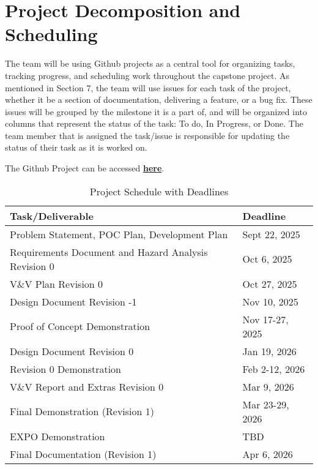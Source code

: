 \documentclass{article}
\begin{document}
\section{Project Decomposition and Scheduling}

The team will be using Github projects as a central tool for organizing tasks, tracking progress, and scheduling work throughout the capstone project. As mentioned in Section 7,
the team will use issues for each task of the project, whether it be a section of documentation, delivering a feature, or a bug fix. These issues will be grouped by the milestone it
is a part of, and will be organized into columns that represent the status of the task: To do, In Progress, or Done. The team member that is assigned the task/issue is responsible
for updating the status of their task as it is worked on.\newline

\noindent The Github Project can be accessed \href{https://github.com/orgs/hitchly/projects/2/views/1}{\bf here}.\\


\begin{table}[h!]
  \centering
  \begin{tabular}{|l|l|}
  \hline
  \textbf{Task/Deliverable} & \textbf{Deadline} \\
  \hline
  Problem Statement, POC Plan, Development Plan & Sept 22, 2025 \\
  \hline
  Requirements Document and Hazard Analysis Revision 0 & Oct 6, 2025 \\
  \hline
  V\&V Plan Revision 0  & Oct 27, 2025 \\
  \hline
  Design Document Revision -1  & Nov 10, 2025 \\
  \hline
  Proof of Concept Demonstration & Nov 17-27, 2025 \\
  \hline
  Design Document Revision 0           & Jan 19, 2026 \\
  \hline
  Revision 0 Demonstration & Feb 2-12, 2026 \\
  \hline
  V\&V Report and Extras Revision 0 & Mar 9, 2026 \\
  \hline
  Final Demonstration (Revision 1) & Mar 23-29, 2026 \\
  \hline
  EXPO Demonstration & TBD \\
  \hline
  Final Documentation (Revision 1) & Apr 6, 2026 \\
  \hline
  \end{tabular}
  \caption{Project Schedule with Deadlines}
  \label{tab:schedule}
  \end{table}
\end{document}
